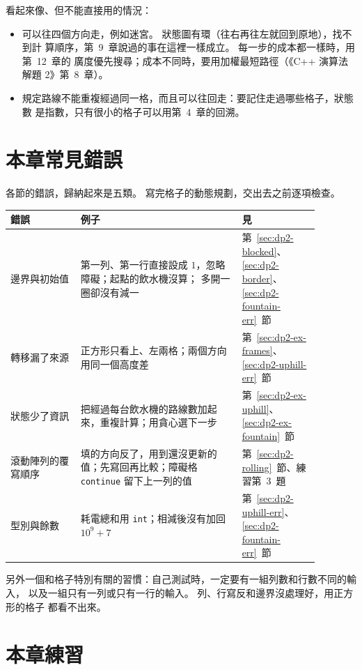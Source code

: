 看起來像、但不能直接用的情況：

\begin{itemize}
\item 可以往四個方向走，例如迷宮。 狀態圖有環（往右再往左就回到原地），找不到計
算順序，第~9~章說過的事在這裡一樣成立。 每一步的成本都一樣時，用第~12~章的
廣度優先搜尋；成本不同時，要用加權最短路徑（《C++ 演算法解題 2》第~8~章）。
\item 規定路線不能重複經過同一格，而且可以往回走：要記住走過哪些格子，狀態數
是指數，只有很小的格子可以用第~4~章的回溯。
\end{itemize}

\section{本章常見錯誤}
\label{sec:dp2-pitfalls}

各節的錯誤，歸納起來是五類。 寫完格子的動態規劃，交出去之前逐項檢查。

\begin{center}
\begin{tabular}{p{0.2\linewidth}p{0.46\linewidth}p{0.22\linewidth}}
\toprule
錯誤 & 例子 & 見 \\
\midrule
邊界與初始值 & 第一列、第一行直接設成 $1$，忽略障礙；起點的飲水機沒算；
多開一圈卻沒有減一 & 第~\ref{sec:dp2-blocked}、\ref{sec:dp2-border}、
\ref{sec:dp2-fountain-err}~節 \\
轉移漏了來源 & 正方形只看上、左兩格；兩個方向用同一個高度差 &
第~\ref{sec:dp2-ex-frames}、\ref{sec:dp2-uphill-err}~節 \\
狀態少了資訊 & 把經過每台飲水機的路線數加起來，重複計算；用貪心選下一步 &
第~\ref{sec:dp2-ex-uphill}、\ref{sec:dp2-ex-fountain}~節 \\
滾動陣列的覆寫順序 & 填的方向反了，用到還沒更新的值；先寫回再比較；障礙格
\texttt{continue} 留下上一列的值 & 第~\ref{sec:dp2-rolling}~節、練習第~3~題 \\
型別與餘數 & 耗電總和用 \texttt{int}；相減後沒有加回 $10^9 + 7$ &
第~\ref{sec:dp2-uphill-err}、\ref{sec:dp2-fountain-err}~節 \\
\bottomrule
\end{tabular}
\end{center}

另外一個和格子特別有關的習慣：自己測試時，一定要有一組列數和行數不同的輸入，
以及一組只有一列或只有一行的輸入。 列、行寫反和邊界沒處理好，用正方形的格子
都看不出來。

\section{本章練習}
\label{sec:dp2-exercises}

